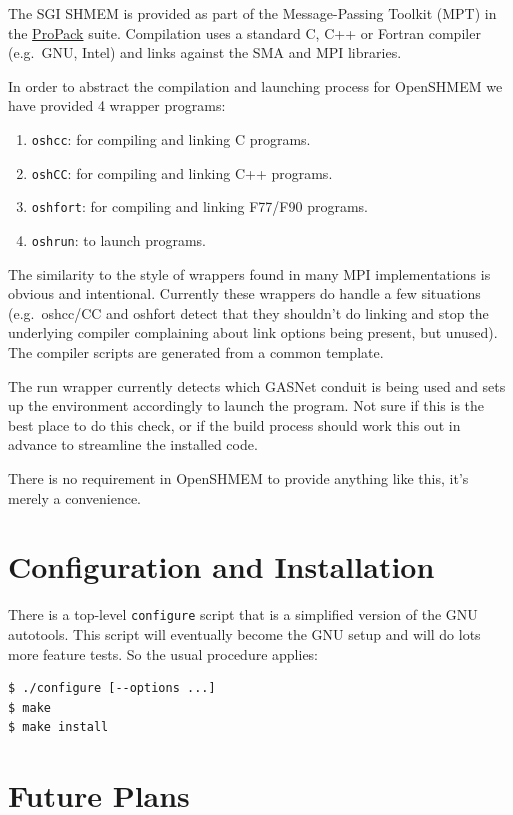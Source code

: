 \documentclass[english]{article}
\begin{document}
The SGI SHMEM is provided as part of the Message-Passing Toolkit (MPT)
in the
\href{http://www.sgi.com/products/software/propack.html}{ProPack}
suite. Compilation uses a standard C, C++ or Fortran compiler
(e.g.\  GNU, Intel) and links against the SMA and MPI libraries.

In order to abstract the compilation and launching process for
OpenSHMEM we have provided 4 wrapper programs:

\begin{enumerate}
\item \texttt{oshcc}: for compiling and linking C programs.
\item \texttt{oshCC}: for compiling and linking C++ programs.
\item \texttt{oshfort}: for compiling and linking F77/F90 programs.
\item \texttt{oshrun}: to launch programs.
\end{enumerate}

The similarity to the style of wrappers found in many MPI
implementations is obvious and intentional. Currently these wrappers
do handle a few situations (e.g.\ oshcc/CC and oshfort detect that they
shouldn't do linking and stop the underlying compiler complaining
about link options being present, but unused). The compiler scripts
are generated from a common template.

The run wrapper currently detects which GASNet conduit is being used
and sets up the environment accordingly to launch the program. Not
sure if this is the best place to do this check, or if the build
process should work this out in advance to streamline the installed
code.

There is no requirement in OpenSHMEM to provide anything like this,
it's merely a convenience.

\section{Configuration and Installation}

There is a top-level \texttt{configure} script that is a simplified
version of the GNU autotools. This script will eventually become the
GNU setup and will do lots more feature tests. So the usual procedure
applies:

\begin{lstlisting}
$ ./configure [--options ...]
$ make
$ make install
\end{lstlisting}

\section{Future Plans}
\end{document}
